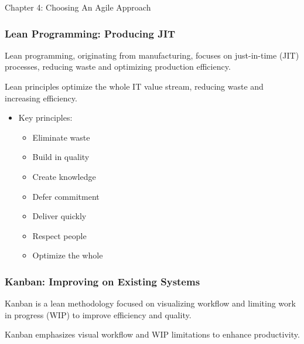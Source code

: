 \begin{notes}{Chapter 4: Choosing An Agile Approach}
\begin{highlight}
    \end{highlight}
    
    \subsubsection*{Lean Programming: Producing JIT}
    
    Lean programming, originating from manufacturing, focuses on just-in-time (JIT) processes, reducing waste and optimizing production efficiency.
    
    \begin{highlight}
    
        Lean principles optimize the whole IT value stream, reducing waste and increasing efficiency.
        
        \begin{itemize}
            \item Key principles:
            \begin{itemize}
                \item Eliminate waste
                \item Build in quality
                \item Create knowledge
                \item Defer commitment
                \item Deliver quickly
                \item Respect people
                \item Optimize the whole
            \end{itemize}
        \end{itemize}
    
    \end{highlight}
    
    \subsubsection*{Kanban: Improving on Existing Systems}
    
    Kanban is a lean methodology focused on visualizing workflow and limiting work in progress (WIP) to improve efficiency and quality.
    
    \begin{highlight}
    
        Kanban emphasizes visual workflow and WIP limitations to enhance productivity.
        

\end{highlight}
\end{notes}
